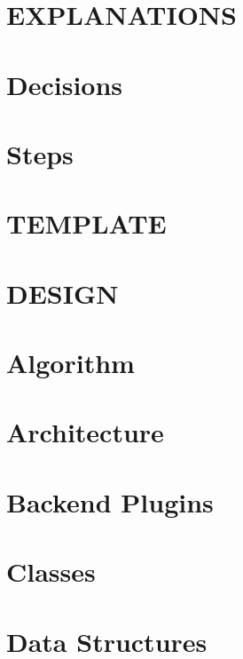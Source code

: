 \let\mypdfximage\pdfximage\def\pdfximage{\immediate\mypdfximage}\documentclass[twoside]{book}
\newcommand{\+}{\discretionary{\mbox{\scriptsize$\hookleftarrow$}}{}{}}
\begin{document}
\chapter{EXPLANATIONS}
\label{doc_decisions_EXPLANATIONS_md}

\chapter{Decisions}
\label{doc_decisions_README_md}

\chapter{Steps}
\label{doc_decisions_STEPS_md}

\chapter{TEMPLATE}
\label{doc_decisions_TEMPLATE_md}

\chapter{DESIGN}
\label{doc_DESIGN_md}

\chapter{Algorithm}
\label{doc_dev_algorithm_md}

\chapter{Architecture}
\label{doc_dev_architecture_md}

\chapter{Backend Plugins}
\label{doc_dev_backend-plugins_md}

\chapter{Classes}
\label{doc_dev_classes_md}

\chapter{Data Structures}
\label{doc_dev_data-structures_md}

\end{document}
